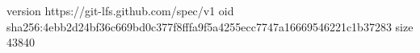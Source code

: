 version https://git-lfs.github.com/spec/v1
oid sha256:4ebb2d24bf36c669bd0c377f8fffa9f5a4255ecc7747a16669546221c1b37283
size 43840
